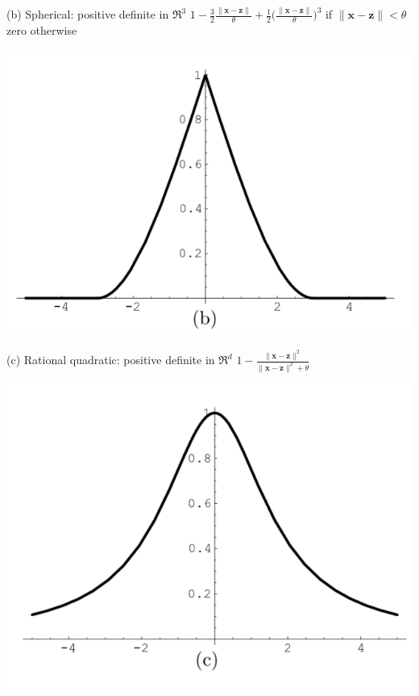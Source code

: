 \documentclass[
  ignorenonframetext,
]{beamer}
\begin{document}
\begin{frame}{}
\protect\hypertarget{section-4}{}
\begin{block}{(b) Spherical:}
\protect\hypertarget{b-spherical}{}
positive definite in \(\mathfrak R^3\)
\(1 - {\frac 3 2} \frac {\|\pmb x - \pmb z\|} \theta + {\frac 1 2} \Big(\frac {\|\pmb x - \pmb z\|} \theta \Big)^3\)
if \(\|\pmb x - \pmb z\| < \theta\) zero otherwise

\begin{center}\includegraphics[width=0.5\linewidth]{figure/marc_f2b} \end{center}
\end{block}
\end{frame}

\begin{frame}{}
\protect\hypertarget{section-5}{}
\begin{block}{(c) Rational quadratic:}
\protect\hypertarget{c-rational-quadratic}{}
positive definite in \(\mathfrak R^d\)
\(1 - \frac {\|\pmb x - \pmb z\|^2} {\|\pmb x - \pmb z\|^2 + \theta}\)

\begin{center}\includegraphics[width=0.5\linewidth]{figure/marc_f2c} \end{center}
\end{block}
\end{frame}
\end{document}
